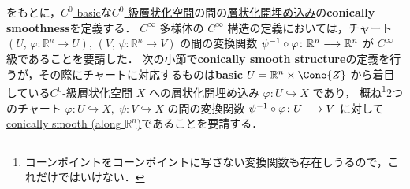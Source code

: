 \documentclass[TQFT_main]{subfiles}
\begin{document}
をもとに，\hyperref[def:C0-basic]{$C^0$ basic}な\hyperref[def:Snglr-C0]{$C^0$ 級層状化空間}の間の\hyperref[def:strat-emb]{層状化開埋め込み}の\textbf{conically smoothness}を定義する．
$C^\infty$ 多様体の $C^\infty$ 構造の定義においては，チャート $(U,\, \varphi \colon \mathbb{R}^n \to U),\, (V,\, \psi \colon \mathbb{R}^n \to V)$ の間の変換関数 $\psi^{-1} \circ \varphi \colon \mathbb{R}^n \longrightarrow \mathbb{R}^{n}$ が $C^\infty$ 級であることを要請した．
次の小節で\textbf{conically smooth structure}の定義を行うが，その際にチャートに対応するものは\textbf{basic} $U = \mathbb{R}^n \times \Cone{Z}$ から着目している\hyperref[def:Snglr-C0]{$C^0$-級層状化空間} $X$ への\hyperref[def:strat-emb]{層状化開埋め込み} $\varphi \colon U \hookrightarrow X$ であり，
概ね\footnote{コーンポイントをコーンポイントに写さない変換関数も存在しうるので，これだけではいけない．}2つのチャート $\varphi \colon U \hookrightarrow X,\; \psi \colon V \hookrightarrow X$ の間の変換関数 $\psi^{-1} \circ \varphi \colon U \longrightarrow V$ に対して\hyperref[def:c-smooth-along]{conically smooth (along $\mathbb{R}^n$)}であることを要請する．
\end{document}
